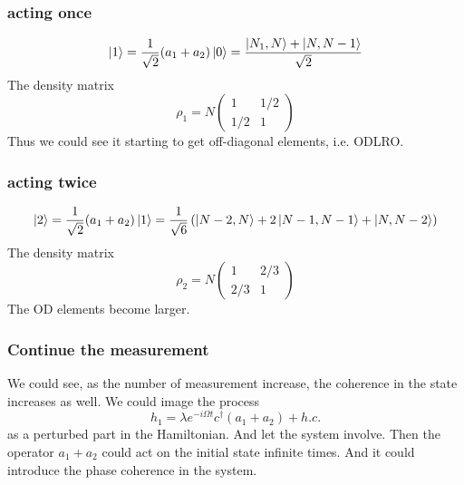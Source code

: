\subsubsection{acting once}
\begin{equation}
\ket 1 =\frac{1}{\sqrt{2} } (a_1+ a_2)\ket{0} = \frac{\ket{N_1,N}+\ket{N,N-1}}{\sqrt{2}}
\end{equation}
The density matrix
\begin{equation}
\rho_1=N\left( \begin{array}{cc}
1 & 1/2\\
1/2 & 1
\end{array} \right)
\end{equation}
Thus we could see it starting to get off-diagonal elements, i.e. ODLRO.

\subsubsection{acting twice}
\begin{equation}
\ket 2 =  \frac{1}{\sqrt{2} }(a_1+ a_2)\ket{1} = \frac{1}{\sqrt{6}} \left(\ket{N-2, N} + 2\ket{N-1,N-1}+\ket{N,N-2}\right) 
\end{equation}
The density matrix
\begin{equation}
\rho_2 = N\left(\begin{array}{cc}
1 & 2/3\\
2/3 & 1
\end{array}\right)
\end{equation}
The OD elements become larger.

\subsubsection{Continue the measurement}
We could see, as the number of measurement increase, the coherence in the state increases as well.
We could image the process
\begin{equation}
h_1 = \lambda e^{-i\Omega t} c^\dag (a_1+a_2)+h.c.
\end{equation}
as a perturbed part in the Hamiltonian. And let the system involve. 
Then the operator $a_1 + a_2$ could act on the initial state infinite times.
And it could introduce the phase coherence in the system.



